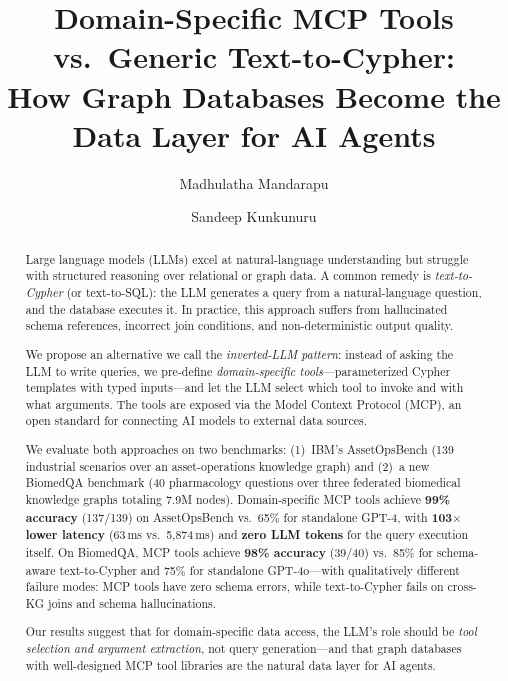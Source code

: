 \documentclass[sigconf]{acmart}
\begin{document}
\title{Domain-Specific MCP Tools vs.\ Generic Text-to-Cypher:\\How Graph Databases Become the Data Layer for AI Agents}

\author{Madhulatha Mandarapu}

\author{Sandeep Kunkunuru}

\begin{abstract}
Large language models (LLMs) excel at natural-language understanding
but struggle with structured reasoning over relational or graph data.
A common remedy is \emph{text-to-Cypher} (or text-to-SQL): the LLM
generates a query from a natural-language question, and the database
executes it.  In practice, this approach suffers from hallucinated
schema references, incorrect join conditions, and
non-deterministic output quality.

We propose an alternative we call the \emph{inverted-LLM pattern}:
instead of asking the LLM to write queries, we pre-define
\emph{domain-specific tools}---parameterized Cypher templates with
typed inputs---and let the LLM select which tool to invoke and with
what arguments.  The tools are exposed via the Model Context Protocol
(MCP), an open standard for connecting AI models to external data
sources.

We evaluate both approaches on two benchmarks:
(1)~IBM's AssetOpsBench (139 industrial scenarios over an asset-operations
knowledge graph) and (2)~a new BiomedQA benchmark (40 pharmacology
questions over three federated biomedical knowledge graphs totaling
7.9M nodes).  Domain-specific MCP tools achieve
\textbf{99\% accuracy} (137/139) on AssetOpsBench vs.\ 65\% for
standalone GPT-4, with \textbf{103$\times$ lower latency} (63\,ms
vs.\ 5,874\,ms) and \textbf{zero LLM tokens} for the query execution
itself.  On BiomedQA, MCP tools achieve \textbf{98\% accuracy}
(39/40) vs.\ 85\% for schema-aware text-to-Cypher and 75\% for
standalone GPT-4o---with qualitatively different failure modes:
MCP tools have zero schema errors, while text-to-Cypher fails
on cross-KG joins and schema hallucinations.

Our results suggest that for domain-specific data access,
the LLM's role should be \emph{tool selection and argument
extraction}, not query generation---and that graph databases
with well-designed MCP tool libraries are the natural data layer
for AI agents.
\end{abstract}
\end{document}
